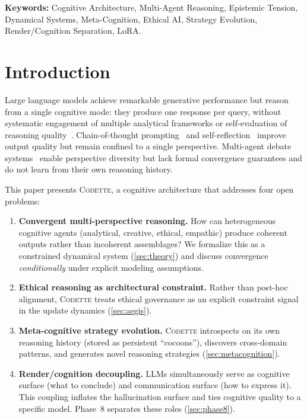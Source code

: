 \documentclass[11pt,a4paper]{article}
\newcommand{\codette}{\textsc{Codette}}
\begin{document}
\noindent\textbf{Keywords:} Cognitive Architecture, Multi-Agent Reasoning,
Epistemic Tension, Dynamical Systems, Meta-Cognition, Ethical AI, Strategy
Evolution, Render/Cognition Separation, LoRA.

\section{Introduction}
\label{sec:intro}

Large language models achieve remarkable generative performance but reason
from a single cognitive mode: they produce one response per query, without
systematic engagement of multiple analytical frameworks or self-evaluation of
reasoning quality~\citep{bender2021dangers,bommasani2021opportunities}.
Chain-of-thought prompting~\citep{wei2022chain} and self-reflection~\citep{shinn2023reflexion}
improve output quality but remain confined to a single perspective. Multi-agent
debate systems~\citep{wu2023autogen} enable perspective diversity but lack
formal convergence guarantees and do not learn from their own reasoning
history.

This paper presents \codette{}, a cognitive architecture that addresses four
open problems:

\begin{enumerate}[leftmargin=*]
  \item \textbf{Convergent multi-perspective reasoning.} How can heterogeneous
    cognitive agents (analytical, creative, ethical, empathic) produce coherent
    outputs rather than incoherent assemblages? We formalize this as a
    constrained dynamical system (\cref{sec:theory}) and discuss convergence
    \emph{conditionally} under explicit modeling assumptions.
  \item \textbf{Ethical reasoning as architectural constraint.} Rather than
    post-hoc alignment, \codette{} treats ethical governance as an explicit
    constraint signal in the update dynamics (\cref{sec:aegis}).
  \item \textbf{Meta-cognitive strategy evolution.} \codette{} introspects on
    its own reasoning history (stored as persistent ``cocoons''), discovers
    cross-domain patterns, and generates novel reasoning strategies
    (\cref{sec:metacognition}).
  \item \textbf{Render/cognition decoupling.} LLMs simultaneously serve as
    cognitive surface (what to conclude) and communication surface (how to
    express it). This coupling inflates the hallucination surface and ties
    cognitive quality to a specific model. Phase~8 separates these roles
    (\cref{sec:phase8}).
\end{enumerate}
\end{document}
